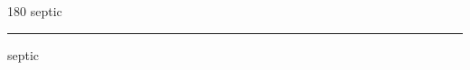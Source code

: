 
\begin{frame}
\begin{center}
\begin{turn}{180}
{\fontsize{2.5cm}{1em}\selectfont septic}
\end{turn}
\vspace{1em}\par  
\hrule
\vspace{1em}\par  
{\fontsize{2.5cm}{1em}\selectfont septic}
\end{center}
\end{frame}
